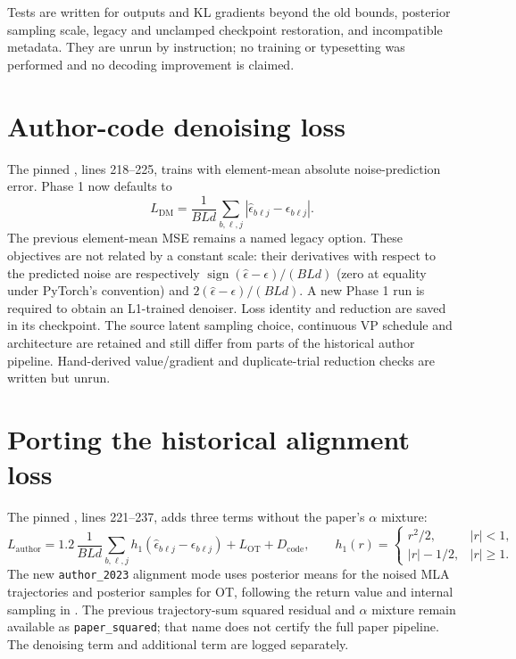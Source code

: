 \documentclass[11pt,a4paper]{article}
\begin{document}
Tests are written for outputs and KL gradients beyond the old bounds,
posterior sampling scale, legacy and unclamped checkpoint restoration, and
incompatible metadata. They are unrun by instruction; no training or
typesetting was performed and no decoding improvement is claimed.

\section{Author-code denoising loss}

The pinned , lines 218--225, trains with
element-mean absolute noise-prediction error. Phase 1 now defaults to
\begin{equation}
 L_{\mathrm{DM}}=\frac{1}{BLd}\sum_{b,\ell,j}
       |\widehat\epsilon_{b\ell j}-\epsilon_{b\ell j}|.
\end{equation}
The previous element-mean MSE remains a named legacy option. These objectives
are not related by a constant scale: their derivatives with respect to the
predicted noise are respectively $\operatorname{sign}(\widehat\epsilon-
\epsilon)/(BLd)$ (zero at equality under PyTorch's convention) and
$2(\widehat\epsilon-\epsilon)/(BLd)$. A new Phase 1 run is required to obtain
an L1-trained denoiser. Loss identity and reduction are saved in its checkpoint.
The source latent sampling choice, continuous VP schedule and architecture
are retained and still differ from parts of the historical author pipeline.
Hand-derived value/gradient and duplicate-trial reduction checks are written
but unrun.

\section{Porting the historical alignment loss}

The pinned , lines 221--237, adds three terms without the
paper's $\alpha$ mixture:
\begin{equation}
 L_{\mathrm{author}}=
 1.2\,\frac{1}{BLd}\sum_{b,\ell,j}
 h_1(\widehat\epsilon_{b\ell j}-\epsilon_{b\ell j})
 + L_{\mathrm{OT}}+D_{\mathrm{code}},\qquad
 h_1(r)=\begin{cases}r^2/2,&|r|<1,\\|r|-1/2,&|r|\geq1.\end{cases}
\end{equation}
The new \texttt{author\_2023} alignment mode uses posterior means for the
noised MLA trajectories and posterior samples for OT, following the return
value and internal sampling in .
The previous trajectory-sum squared residual and $\alpha$ mixture remain
available as \texttt{paper\_squared}; that name does not certify the full
paper pipeline. The denoising term and additional term are logged separately.
\end{document}
